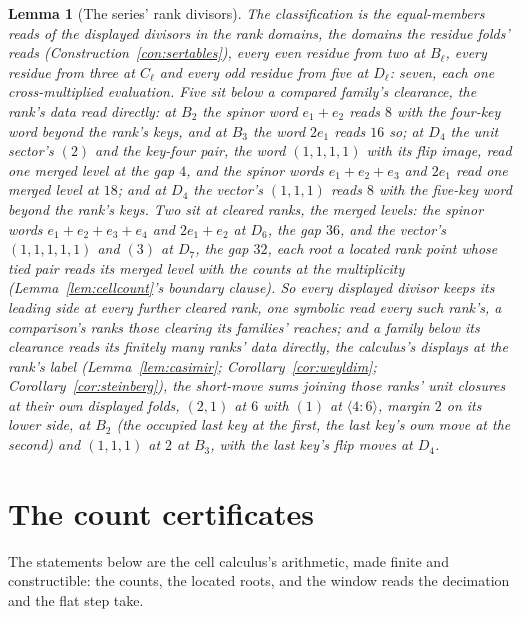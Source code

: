 \documentclass[11pt]{article}
\newtheorem{lemma}{Lemma}
\theoremstyle{definition}
\begin{document}
\begin{lemma}[The series' rank divisors]
\emph{The classification} is the equal-members reads of the
displayed divisors in the rank domains, the domains the residue
folds' reads (Construction~\ref{con:sertables}), every even
residue from two at $B_\ell$, every residue from three at
$C_\ell$ and every odd residue from five at $D_\ell$: seven,
each one cross-multiplied evaluation. Five sit below a compared
family's clearance, the rank's data read directly: at $B_2$ the
spinor word $e_1{+}e_2$ reads $8$ with the four-key word beyond
the rank's keys, and at $B_3$ the word $2e_1$ reads $16$ so; at
$D_4$ the unit sector's $(2)$ and the key-four pair, the word
$(1,1,1,1)$ with its flip image, read one merged level at the
gap $4$, and the spinor words $e_1{+}e_2{+}e_3$ and $2e_1$ read
one merged level at $18$; and at $D_4$ the vector's $(1,1,1)$
reads $8$ with the five-key word beyond the rank's keys. Two sit
at cleared ranks, the merged levels: the spinor words
$e_1{+}e_2{+}e_3{+}e_4$ and $2e_1{+}e_2$ at $D_6$, the gap $36$,
and the vector's $(1,1,1,1,1)$ and $(3)$ at $D_7$, the gap
$32$, each root a located rank point whose tied pair reads its
merged level with the counts at the multiplicity
(Lemma~\ref{lem:cellcount}'s boundary clause). So every
displayed divisor keeps its leading side at every further
cleared rank, one symbolic read every such rank's, a
comparison's ranks those clearing its families' reaches; and a
family below its clearance reads its finitely many ranks' data
directly, the calculus's displays at the rank's label
(Lemma~\ref{lem:casimir}; Corollary~\ref{cor:weyldim};
Corollary~\ref{cor:steinberg}), the short-move sums joining
those ranks' unit closures at their own displayed folds, $(2,1)$
at $6$ with $(1)$ at $\langle4\!:\!6\rangle$, margin $2$ on its
lower side, at $B_2$ (the occupied last key at the first, the
last key's own move at the second) and $(1,1,1)$ at $2$ at
$B_3$, with the last key's flip moves at $D_4$.
\end{lemma}

\section{The count certificates}

The statements below are the cell calculus's arithmetic, made finite
and constructible: the counts, the located roots, and the window reads
the decimation and the flat step take.
\end{document}
